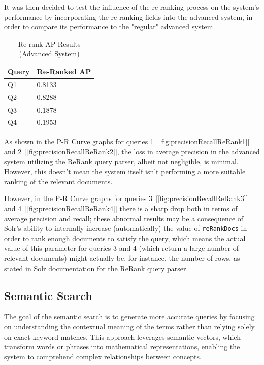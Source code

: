 \documentclass[sigconf]{acmart}
\begin{document}
It was then decided to test the influence of the re-ranking process on the system's performance by incorporating the re-ranking fields into the advanced system, in order to compare its performance to the "regular" advanced system.

\begin{table}[H]
	\begin{tabular}{ | m{5em} | m{1.5cm} | }
		\hline
		Query & Re-Ranked AP \\
		\hline
		Q1 & 0.8133 \\
		\hline
		Q2 & 0.8288 \\
		\hline
		Q3 & 0.1878 \\
		\hline
		Q4 & 0.1953 \\
		\hline
	\end{tabular}
	\caption{Re-rank AP Results (Advanced System)}
	\label{tab:rerank_ap_results}
\end{table}

As shown in the P-R Curve graphs for queries 1~[\ref{fig:precisionRecallReRank1}] and 2~[\ref{fig:precisionRecallReRank2}], the loss in average precision in the advanced system utilizing the ReRank query parser, albeit not negligible, is minimal. However, this doesn't mean the system itself isn't performing a more suitable ranking of the relevant documents. 

However, in the P-R Curve graphs for queries 3~[\ref{fig:precisionRecallReRank3}] and 4~[\ref{fig:precisionRecallReRank4}] there is a sharp drop both in terms of average precision and recall; these abnormal results may be a consequence of Solr's ability to internally increase (automatically) the value of \texttt{reRankDocs} in order to rank enough documents to satisfy the query, which means the actual value of this parameter for queries 3 and 4 (which return a large number of relevant documents) might actually be, for instance, the number of rows, as stated in Solr documentation for the ReRank query parser.

\subsection{Semantic Search}

The goal of the semantic search is to generate more accurate queries by focusing on understanding the contextual meaning of the terms rather than relying solely on exact keyword matches. This approach leverages semantic vectors, which transform words or phrases into mathematical representations, enabling the system to comprehend complex relationships between concepts.
\end{document}
